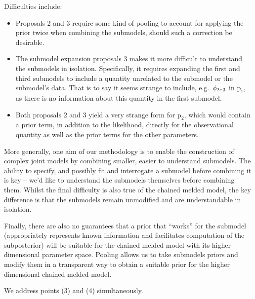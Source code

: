 \documentclass[
  10pt,
  a4paper,
]{article}
\providecommand{\tightlist}{%
  \setlength{\itemsep}{0pt}\setlength{\parskip}{0pt}}
\let\Oldcap\cap
\renewcommand{\cap}{\mathrel{\mathsmaller{\Oldcap}}}
\newcommand{\pd}{\text{p}}
\begin{document}
Difficulties include:

\begin{itemize}
\tightlist
\item
  Proposals 2 and 3 require some kind of pooling to account for applying
  the prior twice when combining the submodels, should such a correction
  be desirable.
\item
  The submodel expansion proposals 3 makes it more difficult to
  understand the submodels in isolation. Specifically, it requires
  expanding the first and third submodels to include a quantity
  unrelated to the submodel or the submodel's data. That is to say it
  seems strange to include, e.g.~\(\phi_{2 \cap 3}\) in \(\pd_{1}\), as
  there is no information about this quantity in the first submodel.
\item
  Both proposals 2 and 3 yield a very strange form for \(\pd_{2}\),
  which would contain a prior term, in addition to the likelihood,
  directly for the observational quantity as well as the prior terms for
  the other parameters.
\end{itemize}

More generally, one aim of our methodology is to enable the construction
of complex joint models by combining smaller, easier to understand
submodels. The ability to specify, and possibly fit and interrogate a
submodel before combining it is key -- we'd like to understand the
submodels themselves before combining them. Whilst the final difficulty
is also true of the chained melded model, the key difference is that the
submodels remain unmodified and are understandable in isolation.

Finally, there are also no guarantees that a prior that ``works'' for
the submodel (appropriately represents known information and facilitates
computation of the subposterior) will be suitable for the chained melded
model with its higher dimensional parameter space. Pooling allows us to
take submodels priors and modify them in a transparent way to obtain a
suitable prior for the higher dimensional chained melded model.

\par

\noindent\hrulefill

\par

We address points (3) and (4) simultaneously.
\end{document}
